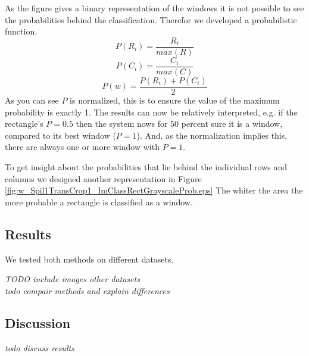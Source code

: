 As the figure gives a binary representation of the windows it is not possible
to see the probabilities behind the classification.
Therefor we developed a probabilistic function. 
\[P(R_i) = \frac{R_i}{max(R)}\]
\[P(C_i) = \frac{C_i}{max(C)}\]
\[P(w) = \frac{P(R_i) + P(C_i)}{2}\]
As you can see $P$ is normalized, this is to ensure the value of the maximum
probability is exactly 1. The results can now be relatively interpreted, e.g. if the rectangle's $P=0.5$
then the system nows for 50 percent sure it is a window, compared to its best window ($P=1$). 
And, as the normalization implies this, there are always one or more window with $P=1$. 

To get insight about the probabilities that lie behind the individual rows and columns
we designed another representation in Figure \ref{fig:w_Spil1TransCrop1_ImClassRectGrayscaleProb.eps}
The whiter the area the more probable a rectangle is classified as a window.



\subsection{Results}
We tested both methods on different datasets.




\emph{TODO include images other datasets} \\
\emph{todo compair methods and explain differences}


\subsection{Discussion}  %
\emph{ todo discuss results }
